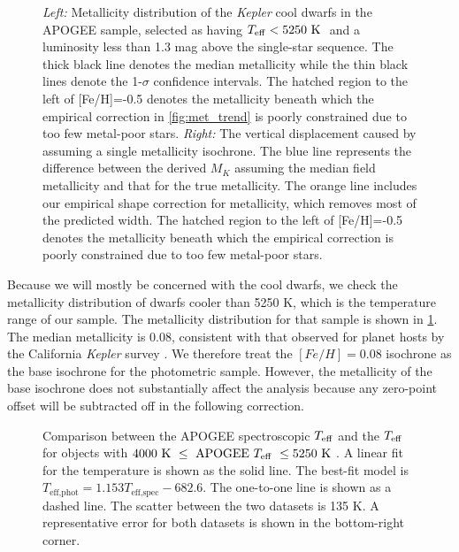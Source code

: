 \documentclass[manuscript]{aastex6}
\newcommand{\Kepler}{\mbox{\textit{Kepler}}}
\newcommand{\Teff}{\ensuremath{T_{\rm eff}}}
\begin{document}
\begin{figure*}[htb]
    \centering
    \caption{\emph{Left:} Metallicity distribution of the \Kepler{} cool 
        dwarfs in the APOGEE sample, selected as having 
        \(\Teff < 5250 \textrm{ K }\) and a luminosity less than 1.3 mag above 
        the single-star sequence. The 
        thick black line denotes the median metallicity while the thin black 
        lines denote the 1-\(\sigma\) confidence intervals. The hatched region
        to the left of [Fe/H]=-0.5 denotes the metallicity beneath which the 
        empirical correction in \cref{fig:met_trend} is poorly constrained due 
        to too few metal-poor stars. \emph{Right:} The vertical displacement 
        caused by assuming a single metallicity isochrone.  The blue line 
        represents the difference between the derived \(M_K\) assuming the 
        median field metallicity and that for the true metallicity. The 
        orange line includes our empirical shape correction for metallicity, 
        which removes most of the predicted width. The hatched region
        to the left of [Fe/H]=-0.5 denotes the metallicity beneath which the 
        empirical correction is poorly constrained due to too few metal-poor 
        stars.}\label{fig:metallicity}
\end{figure*}

Because we will mostly be concerned with the cool dwarfs, we check the
metallicity distribution of dwarfs cooler than 5250 K, which is the 
temperature range of our sample. The metallicity distribution for that
sample is shown in \cref{fig:metallicity}. The median metallicity is 
0.08, consistent with that observed for planet hosts by 
the California \Kepler{} survey \citep{Petigura17}.  We therefore treat the \([Fe/H] =
0.08\) isochrone as the base isochrone for the photometric sample. However, the
metallicity of the base isochrone does not substantially affect the analysis
because any zero-point offset will be subtracted off in the following
correction.

\begin{figure}[htb]
    \centering
    \caption{Comparison between the APOGEE spectroscopic \Teff{} and the
        \citet{Pinsonneault12} \Teff{} for objects with \(4000 \textrm{ K } \le
    \textrm{ APOGEE \Teff{} } \le 5250 \textrm{ K }\). A linear fit for the
    temperature is shown as the solid line. The best-fit model is
    \(T_{\textrm{eff,phot}} = 1.153 T_{\textrm{eff,spec}} - 682.6\). The 
    one-to-one line is shown as a dashed line. The scatter between the two 
    datasets is 135 K. A representative error for both datasets is shown in 
the bottom-right corner.}\label{fig:teffdiff}
\end{figure}
\end{document}
